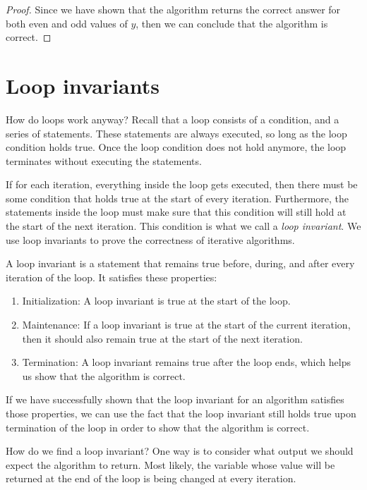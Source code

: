 \begin{example}
\begin{proof}
        Since we have shown that the algorithm returns the correct answer for both even and odd values of $y$, then we can conclude that the algorithm is correct.
    \end{proof}
\end{example}

\section{Loop invariants}
How do loops work anyway? Recall that a loop consists of a condition, and a series of statements. These statements are always executed, so long as the loop condition holds true. Once the loop condition does not hold anymore, the loop terminates without executing the statements.

If for each iteration, everything inside the loop gets executed, then there must be some condition that holds true at the start of every iteration. Furthermore, the statements inside the loop must make sure that this condition will still hold at the start of the next iteration. This condition is what we call a \textit{loop invariant}. We use loop invariants to prove the correctness of iterative algorithms.

\begin{definition}
A loop invariant is a statement that remains true before, during, and after every iteration of the loop. It satisfies these properties:
\begin{enumerate}
    \item Initialization: A loop invariant is true at the start of the loop.
    \item Maintenance: If a loop invariant is true at the start of the current iteration, then it should also remain true at the start of the next iteration.
    \item Termination: A loop invariant remains true after the loop ends, which helps us show that the algorithm is correct.
\end{enumerate}
\end{definition}

If we have successfully shown that the loop invariant for an algorithm satisfies those properties, we can use the fact that the loop invariant still holds true upon termination of the loop in order to show that the algorithm is correct.

How do we find a loop invariant? One way is to consider what output we should expect the algorithm to return. Most likely, the variable whose value will be returned at the end of the loop is being changed at every iteration.

